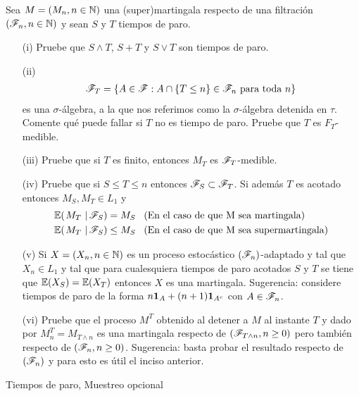 \begin{problema}
	Sea $M=\left( M_n,n\in\mathbb{N}\right) $ una (super)martingala respecto de una filtraci\'on $\left( \mathscr{F}_n,n\in\mathbb{N}\right) $ y sean $S$ y $T$ tiempos de paro.
	
	\begin{enumerate}
					\item[(i)] 
						Pruebe que $S\wedge T$, $S+T$ y $S\vee T$ son tiempos de paro.
					
					\item[(ii)] 
						\begin{align}
							\mathscr{F}_T=\left\{ A\in\mathscr{F}:A\cap\left\{ T\leq n\right\} \in\mathscr{F}_n\text{ para toda } n\right\} 
						\end{align}
						es una $\sigma$-\'algebra, a la que nos referimos como la $\sigma$-\'algebra 
						detenida en $\tau$. Comente qu\'e puede fallar si $T$ no es tiempo de paro. 
						Pruebe que $T$ es $F_T$-medible. 
					
					\item[(iii)] 
						Pruebe que si $T$ es finito, entonces $M_T$ es $\mathscr{F}_T$-medible.
					
					\item[(iv)] 
						Pruebe que si $S\leq T\leq n$ entonces $\mathscr{F}_S\subset\mathscr{F}_T$. Si adem\'as $T$ es acotado entonces $M_S, M_T\in L_1$ y 
						\begin{align}
							\espc{M_T}{\F_S} = M_S &\mbox{\;\;\;(En el caso de que M sea martingala)} \\
							\espc{M_T}{\F_S}\leq M_S &\mbox{\;\;\;(En el caso de que M sea supermartingala)}                 	
						\end{align}

					\item[(v)] 
						Si $X=\left( X_n,n\in\mathbb{N}\right) $ es un proceso estoc\'astico $\left( \mathscr{F}_n\right) $-adaptado y tal que $X_n\in L_1$ y tal que 
						para cualesquiera tiempos de paro acotados $S$ y $T$ se tiene que $\mathbb{E}\! \left( X_S \right)=\mathbb{E}\! \left( X_T \right)$ entonces $X$ es una 
						martingala. Sugerencia: considere tiempos de paro de la forma $n{\bf{1}}_{A}+(n+1){\bf{1}}_{A^c}$ con $A\in\mathscr{F}_n$.
						
					\item[(vi)]
						Pruebe que el proceso $M^T$ obtenido al detener a $M$ al instante $T$ y dado por $M^T_n=M_{T\wedge n}$ es una 
						martingala respecto de $\left( \mathscr{F}_{T\wedge n},n\geq 0\right) $ pero tambi\'en respecto de $\left( \mathscr{F}_{n},n\geq 0\right) $. 
						Sugerencia: basta probar el resultado respecto de $\left( \mathscr{F}_n\right) $ y para esto es \'util el inciso anterior.
	\end{enumerate}

Tiempos de paro, Muestreo opcional
\end{problema}

